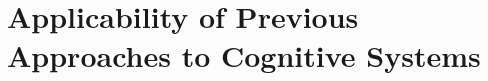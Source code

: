 \documentclass[11pt,letterpaper]{article}
\begin{document}
%
% 

%
%
%
 




\section{Applicability of Previous Approaches to Cognitive Systems }
\end{document}
